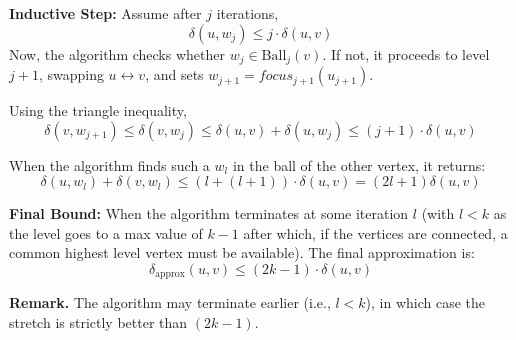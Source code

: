 \documentclass{article}
\begin{document}
\textbf{Inductive Step:}  
Assume after \(j\) iterations,
\[
\delta(u, w_j) \le j \cdot \delta(u, v)
\]
Now, the algorithm checks whether \(w_j \in \text{Ball}_j(v)\). If not, it proceeds to level \(j+1\), swapping \(u \leftrightarrow v\), and sets \(w_{j+1} = focus_{j+1}(u_{j+1})\).

Using the triangle inequality,
\[
\delta(v, w_{j+1}) \le \delta(v, w_j) \le \delta(u, v) + \delta(u, w_j) \le (j+1) \cdot \delta(u, v)
\]

When the algorithm finds such a \(w_l\) in the ball of the other vertex, it returns:
\[
\delta(u, w_l) + \delta(v, w_l) \le (l + (l+1)) \cdot \delta(u,v) = (2l + 1)\delta(u,v)
\]

\textbf{Final Bound:} When the algorithm terminates at some iteration \(l\) (with \(l < k\) as the level goes to a max value of $k - 1$ after which, if the vertices are connected, a common highest level vertex must be available). The final approximation is:
\[
\delta_{\text{approx}}(u,v) \le (2k - 1) \cdot \delta(u, v)
\]

\textbf{Remark.} The algorithm may terminate earlier (i.e., \(l < k\)), in which case the stretch is strictly better than \((2k-1)\).





\end{document}
